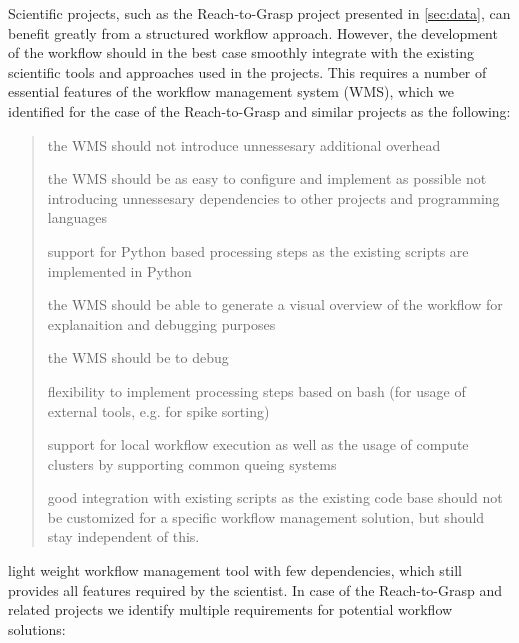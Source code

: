 Scientific projects, such as the Reach-to-Grasp project presented in \ref{sec:data}, can benefit greatly from a structured workflow approach. However, the development of the workflow should in the best case smoothly integrate with the existing scientific tools and approaches used in the projects. This requires a number of essential features of the workflow management system (WMS), which we identified for the case of the Reach-to-Grasp and similar projects as the following:
\begin{quote}
\begin{description}
  \setlength{\itemsep}{0pt}
  \setlength{\parskip}{0pt}
  \setlength{\parsep}{0pt}
 \item[slim] the WMS should not introduce unnessesary additional overhead
 \item[easy] the WMS should be as easy to configure and implement as possible not introducing unnessesary dependencies to other projects and programming languages
 \item[Python support] support for Python based processing steps as the existing scripts are implemented in Python
 \item[visualization] the WMS should be able to generate a visual overview of the workflow for explanaition and debugging purposes
 \item[debug] the WMS should be to debug
 \item[flexible] flexibility to implement processing steps based on bash (for usage of external tools, e.g. for spike sorting)
 \item[cluster support] support for local workflow execution as well as the usage of compute clusters by supporting common queing systems
 \item[integration] good integration with existing scripts as the existing code base should not be customized for a specific workflow management solution, but should stay independent of this.
\end{description}
\end{quote}

light weight workflow management tool with few dependencies, which still provides all features required by the scientist. In case of the Reach-to-Grasp and related projects we identify multiple requirements for potential workflow solutions:



